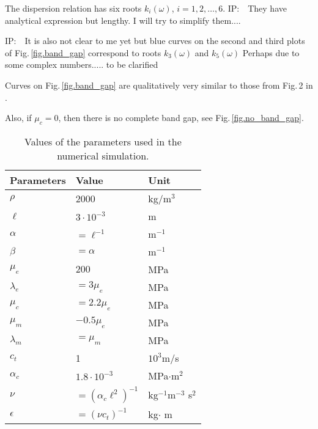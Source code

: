 \documentclass[
10pt, %
a4paper, %
oneside, %
headinclude,footinclude, %
BCOR5mm, %
table,
]{scrartcl}
\newcommand{\IP}[1]{{\color{Red}IP:\ \ #1}}
\begin{document}
The dispersion relation has six roots $ k_i(\omega) $, $ i=1,2,\ldots,6 $.
\IP{They have analytical expression but lengthy. I will try to simplify them....}

\IP{It is also not clear to me yet but blue curves on the second and third plots of 
Fig.\,\ref{fig.band_gap} correspond to roots $ k_3(\omega) $ and $ k_5(\omega) $ Perhaps due to 
some complex numbers..... to be clarified}

Curves on Fig.\,\ref{fig.band_gap} are qualitatively very similar to those from Fig.\,2 in 
\cite{Madeo2015a}.

Also, if $ \mu_c = 0 $, then there is no complete band gap, see Fig.\,\ref{fig.no_band_gap}.


\begin{table}[]
	\begin{tabular}{lll}
		Parameters\hspace{1cm} & Value\hspace{2cm} & Unit \\ \hline
\rowcolor[HTML]{ECF4FF} 
		$ \rho $ & 2000 & kg/m$ ^3 $ \\
\rowcolor[HTML]{CBCEFB} 
		$ \ell  $ & $ 3\cdot10^{-3} $ & m \\
\rowcolor[HTML]{ECF4FF} 
		$ \alpha  $ & $ =\ell^{-1} $ & m$ ^{-1} $ \\
\rowcolor[HTML]{CBCEFB} 
		$ \beta $ & $ =\alpha $ & m$ ^{-1} $	\\
\rowcolor[HTML]{ECF4FF} 
		$ \mu_e $ & $ 200 $ & MPa	\\
\rowcolor[HTML]{CBCEFB} 
		$ \lambda_e $ & $ =3 \mu_e $ & MPa	\\
\rowcolor[HTML]{ECF4FF} 
		$ \mu_c $ & $ =2.2 \mu_e $ & MPa	\\
\rowcolor[HTML]{CBCEFB} 
		$ \mu_m $ & $ -0.5\mu_e $ & MPa	\\
\rowcolor[HTML]{ECF4FF} 
		$ \lambda_m $ & $ =\mu_m $ & MPa	\\
\rowcolor[HTML]{CBCEFB} 
		$ c_t $		& 1	& $ 10^{3} $m/s		\\
\rowcolor[HTML]{ECF4FF} 
		$ \alpha_c $ 	& $ 1.8\cdot10^{-3} $	&	MPa$ \cdot $m$ ^2 $	\\
\rowcolor[HTML]{CBCEFB} 
		$ \nu $	& $ =(\alpha_c \ell^2)^{-1} $	& kg$ ^{-1} $m$ ^{-3} $ s$ ^2 $\\
\rowcolor[HTML]{ECF4FF} 
		$ \epsilon $	& $ =(\nu c_t)^{-1} $	&	kg$ \cdot $ m \\ \hline
	\end{tabular}
	\caption{Values of the parameters used in the numerical simulation.}
	\label{tab.parameters}
\end{table}
\end{document}
